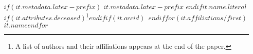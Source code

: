 $if(it.metadata.latex-prefix)$ $it.metadata.latex-prefix$ $endif$$it.name.literal$$if(it.attributes.deceased)$\thanks{A list of authors and their affiliations appears at the end of the paper.}$endif$$if(it.orcid)$~$endif$$for(it.affiliations/first)$\\$it.name$$endfor$
